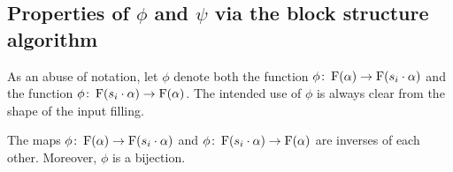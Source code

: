 \subsection{Properties of \texorpdfstring{\(\phi\)}{φ} and \texorpdfstring{\(\psi\)}{ψ} via the block structure algorithm} \label{subsec:properties-of-bijections}

As an abuse of notation, let \(\phi\) denote both the function \(\phi \colon \Fill(\alpha) \to \Fill(s_i \permact \alpha)\) and the function \(\phi \colon \Fill(s_i \permact \alpha) \to \Fill(\alpha)\).
The intended use of \(\phi\) is always clear from the shape of the input filling.

\begin{proposition} \label{prop:phi-inverse}
    The maps \(\phi \colon \Fill(\alpha) \to \Fill(s_i \permact \alpha)\) and \(\phi \colon \Fill(s_i \permact \alpha) \to \Fill(\alpha)\) are inverses of each other.
    Moreover, \(\phi\) is a bijection.
\end{proposition}


